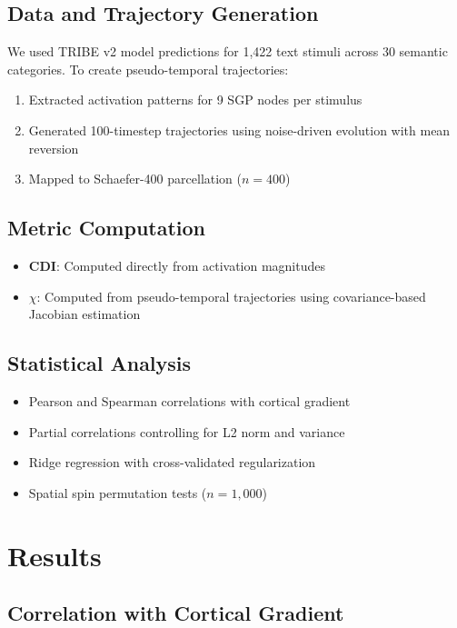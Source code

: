 \documentclass[11pt]{article}
\begin{document}
\subsection{Data and Trajectory Generation}

We used TRIBE v2 model predictions \citep{dAscoli2026} for 1,422 text stimuli across 30 semantic categories. To create pseudo-temporal trajectories:

\begin{enumerate}
	\item Extracted activation patterns for 9 SGP nodes per stimulus
	\item Generated 100-timestep trajectories using noise-driven evolution with mean reversion
	\item Mapped to Schaefer-400 parcellation ($n = 400$) \citep{Schaefer2018}
\end{enumerate}

\subsection{Metric Computation}

\begin{itemize}
	\item \textbf{CDI}: Computed directly from activation magnitudes
	\item \textbf{$\chi$}: Computed from pseudo-temporal trajectories using covariance-based Jacobian estimation
\end{itemize}

\subsection{Statistical Analysis}

\begin{itemize}
	\item Pearson and Spearman correlations with cortical gradient
	\item Partial correlations controlling for L2 norm and variance
	\item Ridge regression with cross-validated regularization
	\item Spatial spin permutation tests ($n = 1,000$)
\end{itemize}

\section{Results}

\subsection{Correlation with Cortical Gradient}
\end{document}
